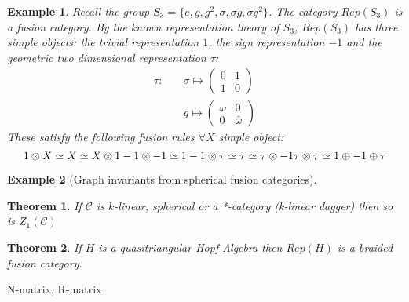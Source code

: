\documentclass{article}
\newtheorem{example}{Example}
\newtheorem{theorem}{Theorem}
\begin{document}
	\begin{example}
		Recall the group $S_3=\{e, g, g^2, \sigma, \sigma g, \sigma g^2 \}$. The category $Rep(S_3)$ is a fusion category. By the known representation theory of $S_3$, $Rep(S_3)$ has three simple objects: the trivial representation $1$, the sign representation $-1$ and the geometric two dimensional representation $\tau$:
		\begin{equation*}
		\begin{split}
		\tau : \quad & \sigma \mapsto \left( {\begin{array}{cc} 0 & 1 \\ 1 & 0 \end{array}}\right) \\
		& g \mapsto \left( {\begin{array}{cc} \omega & 0 \\ 0 & \bar{\omega} \end{array}}\right)
		\end{split}
		\end{equation*}
		These satisfy the following fusion rules $\forall X$ simple object:
		\begin{equation}
		1 \otimes X \simeq X \simeq X \otimes 1\\
		-1 \otimes -1 \simeq 1\\
		-1 \otimes \tau \simeq \tau \simeq \tau \otimes -1\\
		\tau \otimes \tau \simeq 1 \oplus -1 \oplus \tau\\
		\end{equation}		
	\end{example}
	
	\begin{example}[Graph invariants from spherical fusion categories]
	\end{example}

	\begin{theorem}
		If $\mathcal{C}$ is $k$-linear, spherical or a *-category (k-linear dagger) then so is $Z_1(\mathcal{C})$ 
	\end{theorem}

	\begin{theorem}
		If $H$ is a quasitriangular Hopf Algebra then $Rep(H)$ is a braided fusion category.
	\end{theorem}
	
	N-matrix, R-matrix
\end{document}
